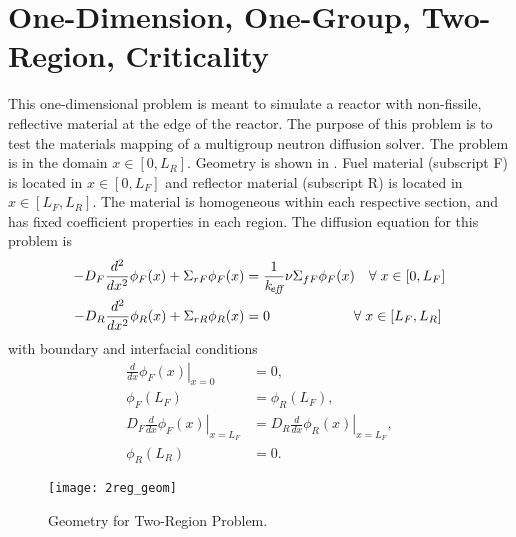 \section{One-Dimension, One-Group, Two-Region, Criticality}
  \label{sec:deriv_2reg}
  This one-dimensional problem is meant to simulate a reactor with non-fissile,
  reflective material at the edge of the reactor. The purpose of this problem is
  to test the materials mapping of a multigroup neutron diffusion solver. The
  problem is in the domain $x \in [0,L_R]$. Geometry is shown in
  . Fuel material (subscript F) is located in $x \in
  [0,L_F]$ and reflector material (subscript R) is located in $ x \in
  [L_F,L_R]$. The material is homogeneous within each respective section, and
  has fixed coefficient properties in each region.  The diffusion equation for
  this problem is 
  \begin{align}
    \label{eq:2regF}
    -D_F \frac{d^2}{dx^2} \phi_F(x) + \Sigma_{rF} \phi_F(x) &= \frac{1}{k_{\!\mbox{\scriptsize \em eff}}} 
      \nu \Sigma_{fF} \phi_F(x) \quad \forall \; x \in [0,L_F] \\
    \label{eq:2regR}
    -D_R \frac{d^2}{dx^2} \phi_R(x) + \Sigma_{rR} \phi_R(x) &= 0  
      \qquad \qquad \qquad \forall \; x \in [L_F,L_R]
  \end{align}
  with boundary and interfacial conditions
  \begin{align}
    \label{eq:2reg_bc0}
    \left. \frac{d}{dx} \phi_F(x) \right|_{x=0} &= 0, \\
    \label{eq:2reg_flux_continuity}
    \phi_F(L_F) &= \phi_R(L_F) ,\\
    \label{eq:2reg_current_continuity}
    D_F \left. \frac{d}{dx} \phi_F(x) \right|_{x=L_F} &= 
      D_R \left. \frac{d}{dx} \phi_R(x) \right|_{x=L_F} ,\\
    \label{eq:2reg_bcLR}
    \phi_R(L_R) &= 0.
  \end{align}
  \begin{figure}
    \centering
    \texttt{[image: 2reg\_geom]}
    \caption{Geometry for Two-Region Problem.}
    \label{fig:2reg_geom}
  \end{figure}

